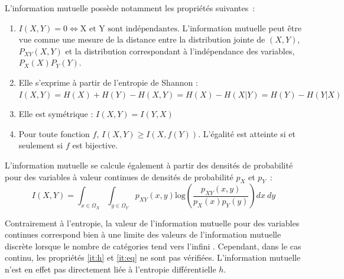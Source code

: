 \documentclass[../main]{subfiles}
\begin{document}
L'information mutuelle possède notamment les propriétés suivantes~:
\begin{enumerate}
\item $I(X,Y) = 0 \Leftrightarrow \textrm{X et Y sont indépendantes}$. L'information mutuelle peut être vue comme une mesure de la distance entre la distribution jointe de $(X,Y)$, $P_{XY}(X,Y)$ et la distribution correspondant à l'indépendance des variables, $P_X(X)P_Y(Y)$.
\item\label{it:h} Elle s'exprime à partir de l'entropie de Shannon : $I(X,Y) = H(X) + H(Y) - H(X,Y) = H(X) - H(X|Y) = H(Y) - H(Y|X)$
\item Elle est symétrique : $I(X,Y) = I(Y,X)$
\item\label{it:eq} Pour toute fonction $f$, $I(X,Y) \geq I(X,f(Y))$. L'égalité est atteinte si et seulement si $f$ est bijective.
\end{enumerate}

L'information mutuelle se calcule également à partir des densités de probabilité pour des variables à valeur continues de densités de probabilité $p_X$ et $p_Y$~:
\begin{equation}
    I(X,Y) = \int_{x \in \Omega_X}\int_{y \in \Omega_Y }{p_{XY}(x,y)\textrm{log}(\frac{p_{XY}(x,y)}{p_X(x)p_Y(y)})dx \: dy}
\end{equation}

Contrairement à l'entropie, la valeur de l'information mutuelle pour des variables continues correspond bien à une limite des valeurs de l'information mutuelle discrète lorsque le nombre de catégories tend vers l'infini \parencite{Cover2005ElementsOI}.
Cependant, dans le cas continu, les propriétés \ref{it:h} et \ref{it:eq} ne sont pas vérifiées. L'information mutuelle n'est en effet pas directement liée à l'entropie différentielle $h$.
\end{document}
